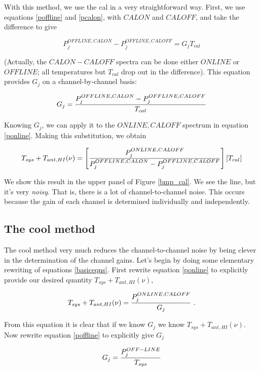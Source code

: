 	With this method, we use the cal in a very straightforward way.
First, we use equations \ref{poffline} and \ref{pcalon}, with $CALON$ and
$CALOFF$,  and take the difference to give

\begin{mathletters}
\begin{equation} \label{naive1}
P_j^{OFFLINE,CALON} - P_j^{OFFLINE,CALOFF} =  G_j T_{cal}
\end{equation}

\noindent (Actually, the $CALON-CALOFF$ spectra can be done either $ONLINE$
or $OFFLINE$; all temperatures but $T_{cal}$ drop out in the difference).
This equation provides $G_j$ on a channel-by-channel basis:

\begin{equation} \label{naive2}
G_j = {P_j^{OFFLINE,CALON} - P_j^{OFFLINE,CALOFF} \over T_{cal}}
\end{equation}
\end{mathletters}

\noindent Knowing $G_j$, we can apply it to the $ONLINE,CALOFF$ spectrum
in equation \ref{ponline}. Making this substitution, we obtain

\begin{equation} \label{naive3}
T_{sys} + T_{ant, HI}(\nu) = \left[ {P_j^{ONLINE, CALOFF} \over 
P_j^{OFFLINE,CALON} - P_j^{OFFLINE,CALOFF}} \right] \left[ T_{cal} \right]
\end{equation}

\noindent We show this result in the upper panel of Figure \ref{bmp_cal}.
We see the line, but it's very {\it noisy}. That is, there is a lot of
channel-to-channel noise. This occurs because the gain of each channel
is determined individually and independently. 

\subsection{The cool method}

	The cool method very much reduces the channel-to-channel noise
by being clever in the determination of the channel gains. Let's begin
by doing some elementary rewriting of equations \ref{basiceqns}. First
rewrite equation \ref{ponline} to explicitly provide our desired quantity
$T_{sys} + T_{ant,HI}(\nu)$,

\begin{mathletters}

\begin{equation} \label{ponline1}
T_{sys} + T_{ant, HI}(\nu) = {P_j^{ONLINE, CALOFF} \over G_j}   \ .
\end{equation}

\noindent From this equation it is clear that if we know $G_j$ we know
$T_{sys} + T_{ant, HI}(\nu)$. Now rewrite equation \ref{poffline} to
explicitly give $G_j$

\begin{equation} \label{cool1}
G_j = {P_j^{OFF-LINE} \over T_{sys} }
\end{equation}

\end{mathletters}

